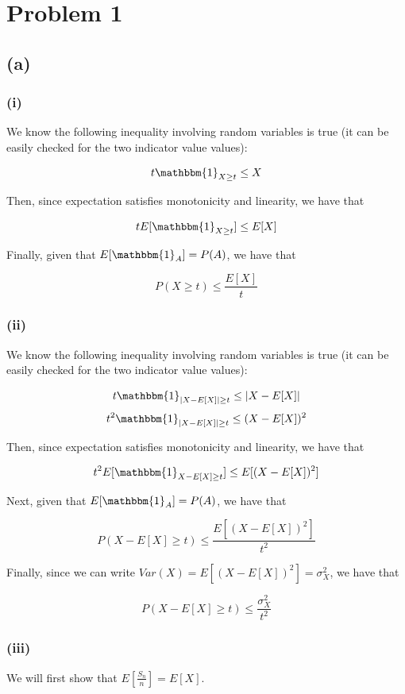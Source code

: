 \documentclass{article}
\begin{document}
\section*{Problem 1}
\subsection*{(a)}
\subsubsection*{(i)}
We know the following inequality involving random variables is true (it can
be easily checked for the two indicator value values):

\[ t \mathbbm{1}_{X \geq t} \leq X \]

Then, since expectation satisfies monotonicity and linearity, we have that

\[ t E[\mathbbm{1}_{X \geq t}] \leq E[X] \]

Finally, given that $E[\mathbbm{1}_A] = P(A)$, we have that

\[ P(X \geq t) \leq \frac{E[X]}{t} \]

\subsubsection*{(ii)}
We know the following inequality involving random variables is true (it can
be easily checked for the two indicator value values):

\[ t \mathbbm{1}_{|X - E[X]| \geq t} \leq |X - E[X]| \]
\[ t^2 \mathbbm{1}_{|X - E[X]| \geq t} \leq (X - E[X])^2 \]

Then, since expectation satisfies monotonicity and linearity, we have that

\[ t^2 E[\mathbbm{1}_{X - E[X] \geq t}] \leq E[(X - E[X])^2] \]

Next, given that $E[\mathbbm{1}_A] = P(A)$, we have that

\[ P(X - E[X] \geq t) \leq \frac{E[(X - E[X])^2]}{t^2} \]

Finally, since we can write $Var(X) = E[(X - E[X])^2] = \sigma_X^2$, we have that

\[ P(X - E[X] \geq t) \leq \frac{\sigma_X^2}{t^2} \]

\subsubsection*{(iii)}
We will first show that $E[\frac{S_n}{n}] = E[X]$. 
\end{document}
